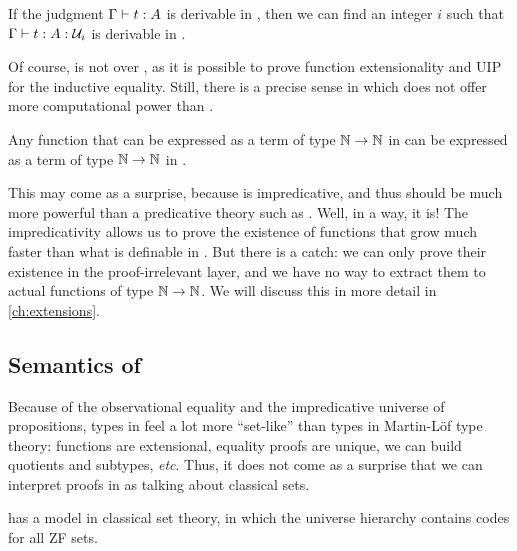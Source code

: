 \begin{theorem}[Embedding]
	If the judgment \( \Gamma \vdash t : A \) is derivable in \MLTT, then
	we can find an integer \( i \) such that \( \Gamma \vdash t : A : \mathcal{U}_i \)
	is derivable in \SetoidCC. 
\end{theorem} 

Of course, \SetoidCC is not 
over \MLTT, as it is possible to prove function extensionality 
and UIP for the inductive equality.
% 
Still, there is a precise sense in which \SetoidCC does not offer more
computational power than \MLTT. 

\begin{theorem}
	Any function that can be expressed as a term of type \( \mathbb{N} \to \mathbb{N} \)
	in \SetoidCC can be expressed as a term of type \( \mathbb{N} \to \mathbb{N} \) in
	\MLTT.
\end{theorem}

This may come as a surprise, because \SetoidCC is impredicative, and thus
should be much more powerful than a predicative theory such as \MLTT. 
% 
Well, in a way, it is! The impredicativity allows us to prove the existence
of functions that grow much faster than what is definable in \MLTT. But there is
a catch: we can only prove their existence in the proof-irrelevant layer, and
we have no way to extract them to actual functions of type \( \mathbb{N} \to \mathbb{N} \).
We will discuss this in more detail in \cref{ch:extensions}.

\subsection{Semantics of \SetoidCC}

Because of the observational equality and the impredicative universe of 
propositions, types in \SetoidCC feel a lot more ``set-like'' than types
in Martin-Löf type theory: functions are extensional, equality 
proofs are unique, we can build quotients and subtypes, \textit{etc}.
% 
Thus, it does not come as a surprise that we can interpret proofs in 
\SetoidCC as talking about classical sets.

\begin{theorem}
	\SetoidCC has a model in classical set theory, in which the universe
	hierarchy contains codes for all ZF sets.
\end{theorem}

